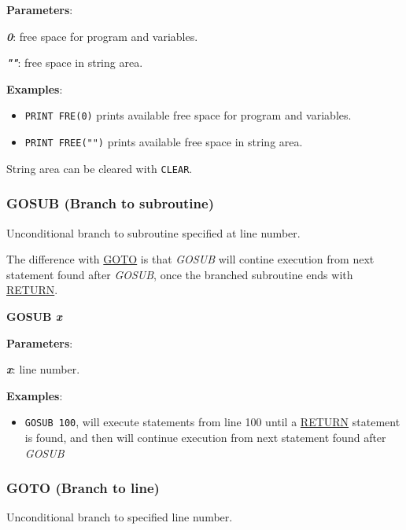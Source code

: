     \textbf{Parameters}:

    \hspace{1cm}\textbf{\textit{0}}: free space for program and variables.

    \hspace{1cm}\textbf{\textit{""}}: free space in string area.

    \textbf{Examples}:
    \begin{itemize}
        \item \texttt{PRINT FRE(0)} prints available free space for program and
        variables.
        \item \texttt{PRINT FREE("")} prints available free space in string area.
    \end{itemize}

    String area can be cleared with \texttt{CLEAR}.

    \subsubsection{{GOSUB (Branch to subroutine)}}
    \label{msbasic:lang:gosub}
    Unconditional branch to subroutine specified at line number.

    The difference with \hyperref[msbasic:lang:goto]{GOTO} is that
    \textit{GOSUB} will contine execution from next statement found after
    \textit{GOSUB}, once the branched subroutine ends with
    \hyperref[msbasic:lang:return]{RETURN}.

    \hspace{1.9cm}\textbf{GOSUB \textit{x}}

    \textbf{Parameters}:

    \hspace{1cm}\textbf{\textit{x}}: line number.

    \textbf{Examples}:
    \begin{itemize}
        \item \texttt{GOSUB 100}, will execute statements from line 100 until a
        \hyperref[msbasic:lang:return]{RETURN} statement is found, and then will
        continue execution from next statement found after \textit{GOSUB}
    \end{itemize}

    \subsubsection{{GOTO (Branch to line)}}
    \label{msbasic:lang:goto}
    Unconditional branch to specified line number.

